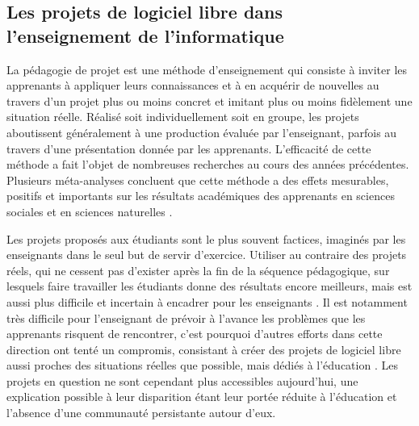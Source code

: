 \documentclass[dvipsnames]{llncs}
\begin{document}
    \subsection{Les projets de logiciel libre dans l'enseignement de l'informatique}
    La pédagogie de projet est une méthode d'enseignement qui consiste à inviter
    les apprenants à appliquer leurs connaissances et à en acquérir de nouvelles
    au travers d'un projet plus ou moins concret et imitant plus ou moins
    fidèlement une situation réelle. Réalisé soit individuellement soit en
    groupe, les projets aboutissent généralement à une production évaluée par
    l'enseignant, parfois au travers d'une présentation donnée par les
    apprenants. L'efficacité de cette méthode a fait l'objet de nombreuses
    recherches au cours des années précédentes. Plusieurs méta-analyses
    concluent que cette méthode a des effets mesurables, positifs et importants
    sur les résultats académiques des apprenants en sciences sociales et en
    sciences naturelles \cite{pbl-2019, pbl-2018}.

    Les projets proposés aux étudiants sont le plus souvent factices, imaginés
    par les enseignants dans le seul but de servir d'exercice. Utiliser au
    contraire des projets réels, qui ne cessent pas d'exister après la fin de la
    séquence pédagogique, sur lesquels faire travailler les étudiants donne des
    résultats encore meilleurs, mais est aussi plus difficile et incertain à
    encadrer pour les enseignants \cite{real-pbl-2010, real-pbl-2004}. Il est
    notamment très difficile pour l'enseignant de prévoir à l'avance les
    problèmes que les apprenants risquent de rencontrer, c'est pourquoi d'autres
    efforts dans cette direction ont tenté un compromis, consistant à créer des
    projets de logiciel libre aussi proches des situations réelles que possible,
    mais dédiés à l'éducation \cite{oss-edu-2008}. Les projets en question ne
    sont cependant plus accessibles aujourd'hui, une explication possible à leur
    disparition étant leur portée réduite à l'éducation et l'absence d'une
    communauté persistante autour d'eux.
\end{document}
